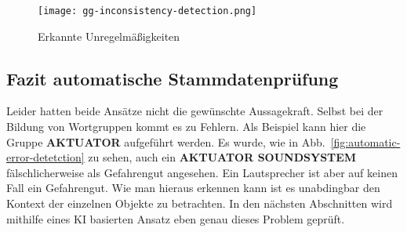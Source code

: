 \begin{figure}[htbp]
  \centering
  \texttt{[image: gg-inconsistency-detection.png]}
  \caption{Erkannte Unregelmäßigkeiten}
  \label{fig:automatic-error-detection}
\end{figure}

\newpage

\subsection{Fazit automatische Stammdatenprüfung}

Leider hatten beide Ansätze nicht die gewünschte Aussagekraft. Selbst bei der
Bildung von Wortgruppen kommt es zu Fehlern. Als Beispiel kann hier die
Gruppe \textbf{AKTUATOR} aufgeführt werden. Es wurde, wie in
Abb.~\ref{fig:automatic-error-detetction} zu sehen, auch ein
\textbf{AKTUATOR SOUNDSYSTEM} fälschlicherweise als Gefahrengut angesehen.
Ein Lautsprecher ist aber auf keinen Fall ein Gefahrengut. Wie man hieraus
erkennen kann ist es unabdingbar den Kontext der einzelnen Objekte zu
betrachten. In den nächsten Abschnitten wird mithilfe eines KI basierten
Ansatz eben genau dieses Problem geprüft.



